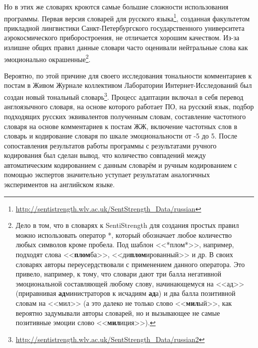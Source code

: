 Но в этих же словарях кроются самые большие сложности использования программы. Первая версия словарей для русского языка\footnote{\href{http://sentistrength.wlv.ac.uk/SentStrength\_Data/russian}{http://sentistrength.wlv.ac.uk/SentStrength\_Data/russian}}, созданная факультетом прикладной лингвистики Санкт-Петербургского государственного университета аэрокосмического приборостроения, не отличается хорошим качеством. Из-за излишне общих правил данные словари часто оценивали нейтральные слова как эмоционально окрашенные\footnote{
Дело в том, что в словарях к SentiStrength для создания простых правил можно использовать оператор *, который обозначает любое количество любых символов кроме пробела. Под шаблон <<*плом*>>, например, подходят слова <<\textbf{плом}ба>>, <<ди\textbf{плом}ированный>> и др. В своих словарях авторы переусердствовали с применением данного оператора. Это привело, например, к тому, что словари дают три балла негативной эмоциональной составляющей любому слову, начинающемуся на <<ад>> (приравнивая \textbf{ад}министраторов к исчадиям \textbf{ад}а) и два балла позитивной словам на <<мил>> (а это далеко не только слово <<\textbf{мил}ый>>, как вероятно задумывали авторы словарей, но и вызывающее не самые позитивные эмоции слово <<\textbf{мил}иция>>).
}.

\begin{comment}
Особенности SentiStrength:
Чтобы слова-отрицатели на русском работали без проблем, надо поставить перед ними английское слово

Слова с модулем тональности 1 не влияют на оценку (возможно они нужны, чтобы давать баллы, находясь рядом со словами-усилителями)
\end{comment}

Вероятно, по этой причине для своего исследования тональности комментариев к постам в Живом Журнале коллективом Лаборатории Интернет-Исследований был создан новый тональный словарь\footnote{\href{http://sentistrength.wlv.ac.uk/SentStrength\_Data/russian2}{http://sentistrength.wlv.ac.uk/SentStrength\_Data/russian2}}\cite{hse_sentistrength}. Процесс адаптации включал в себя перевод англоязычного словаря, на основе которого работает ПО, на русский язык, подбор подходящих русских эквивалентов полученным словам, составление частотного словаря на основе комментариев к постам ЖЖ, включение частотных слов в словарь и кодирование словаря по шкале эмоциональности от -5 до 5. После сопоставления результатов работы программы с результатами ручного кодирования был сделан вывод, что количество совпадений между автоматическим кодированием с данным словарём и ручным кодированием с помощью экспертов значительно уступает результатам аналогичных экспериментов на английском языке.

